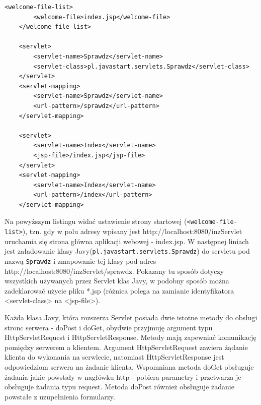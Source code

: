 \documentclass[eng,printmode,oneside]{mgr}
\begin{document}
\lstset{language=XML,firstnumber=1,stepnumber=1}
\begin{lstlisting}[caption=Przykladowy ,label=webxml]
	<welcome-file-list>
		<welcome-file>index.jsp</welcome-file>
	</welcome-file-list>

	<servlet>
		<servlet-name>Sprawdz</servlet-name>
		<servlet-class>pl.javastart.servlets.Sprawdz</servlet-class>
	</servlet>
	<servlet-mapping>
		<servlet-name>Sprawdz</servlet-name>
		<url-pattern>/sprawdz</url-pattern>
	</servlet-mapping>
	
	<servlet>
		<servlet-name>Index</servlet-name>
		<jsp-file>/index.jsp</jsp-file>
	</servlet>
	<servlet-mapping>
		<servlet-name>Index</servlet-name>
		<url-pattern>/index</url-pattern>
	</servlet-mapping>
\end{lstlisting}

Na powyższym listingu widać ustawienie strony startowej
(\texttt{<welcome-file-list>}), tzn. gdy w polu adresy wpisany jest
http://localhost:8080/inzServlet uruchamia się strona główna aplikacji webowej -
index.jsp. W następnej liniach jest załadowanie klasy
Javy(\texttt{pl.javastart.servlets.Sprawdz}) do servletu pod nazwą
\texttt{Sprawdz} i zmapowanie tej klasy pod adres
http://localhost:8080/inzServlet/sprawdz. Pokazany tu sposób dotyczy wszystkich
używanych przez Servlet klas Javy, w podobny sposób można zadeklarować użycie
pliku *.jsp (różnica polega na zamianie identyfikatora <servlet-class> na
<jsp-file>). 

Każda klasa Javy, która rozszerza Servlet posiada dwie istotne metody do obsługi
stronc serwera - doPost i doGet, obydwie przyjmuję argument typu
HttpServletRequest i HttpServletResponse.
Metody mają zapewniać komunikację pomiędzy serwerem a klientem. Argument
HttpServletRequest zawiera żądanie klienta do wykonania na serwlecie, natomiast
HttpServletResponse jest odpowiedziom serwera na żadanie klienta. Wspomniana
metoda doGet obsługuje żadania jakie powstały w nagłówku http - pobiera
parametry i przetwarza je - obsługuje żadania typu request. Metoda doPost
również obsługuje żadanie powstałe z uzupełnienia formularzy. 
\end{document}
